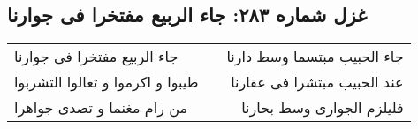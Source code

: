 \begin{center}
\section*{غزل شماره ۲۸۳: جاء الربیع مفتخرا فی جوارنا}
\label{sec:0283}
\begin{longtable}{l p{0.5cm} r}
جاء الربیع مفتخرا فی جوارنا
&&
جاء الحبیب مبتسما وسط دارنا
\\
طیبوا و اکرموا و تعالوا التشربوا
&&
عند الحبیب مبتشرا فی عقارنا
\\
من رام مغنما و تصدی جواهرا
&&
فلیلزم الجواری وسط بحارنا
\\
\end{longtable}
\end{center}
